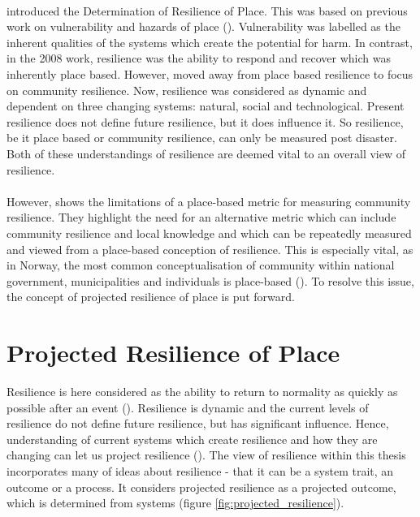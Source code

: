\paragraph{}


\cite{cutter_place-based_2008} introduced the Determination of Resilience of Place. This was based on previous work on vulnerability and hazards of place (\cite{cutter_vulnerability_1996}).  Vulnerability was labelled as the inherent qualities of the systems which create the potential for harm. In contrast, in the 2008 work, resilience was the ability to respond and recover which was inherently place based. However, \cite{cutter_community_2020} moved away from place based resilience to focus on community resilience. Now, resilience was considered as dynamic and dependent on three changing systems: natural, social and technological. Present resilience does not define future resilience, but it does influence it. So resilience, be it place based or community resilience, can only be measured post disaster. Both of these understandings of resilience are deemed vital to an overall view of resilience.
\paragraph{}

However, \cite{rasanen_conceptualizing_2020} shows the limitations of a place-based metric for measuring community resilience. They highlight the need for an alternative metric which can include community resilience and local knowledge and which can be repeatedly measured and viewed from a place-based conception of resilience. This is especially vital, as in Norway, the most common conceptualisation of community within national government, municipalities and individuals is place-based (\cite{rasanen_conceptualizing_2020}). To resolve this issue, the concept of projected resilience of place is put forward. 




\section{Projected Resilience of Place} 
\label{theory-resilience}
Resilience is here considered as the ability to return to normality as quickly as possible after an event (\cite{cutter_place-based_2008}). Resilience is dynamic and the current levels of resilience do not define future resilience, but has significant influence. Hence, understanding of current systems which create resilience and how they are changing can let us project resilience (\cite{cutter_community_2020}). The view of resilience within this thesis incorporates many of \cite{moser_turbulent_2019} ideas about resilience -  that it can be a system trait, an outcome or a process. It considers projected resilience as a projected outcome, which is determined from systems (figure \ref{fig:projected_resilience}). 

